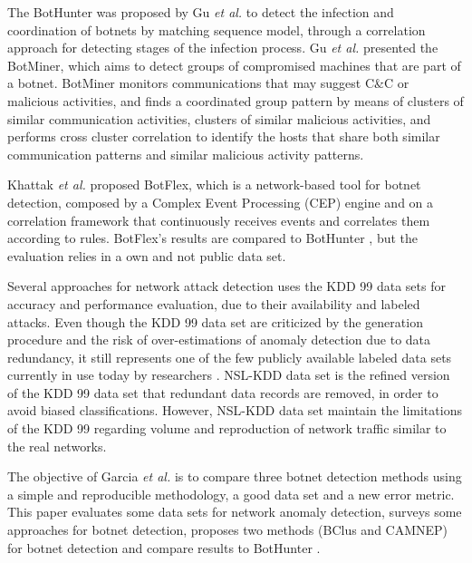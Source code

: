 The BotHunter was proposed by Gu \emph{et al.} \cite{gu2007bothunter} to detect the infection and coordination of botnets by matching sequence model, through a correlation approach for detecting stages of the infection process.  Gu \emph{et al.} \cite{gu2008botminer} presented the BotMiner, which aims to detect groups of compromised machines that are part of a botnet. BotMiner monitors communications that may suggest C\&C or malicious activities, and finds a coordinated group pattern by means of clusters of similar communication activities, clusters of similar malicious activities, and performs cross cluster correlation to identify the hosts that share both similar communication patterns and similar malicious activity patterns.

Khattak \emph{et al.} \cite{khattak2015botflex} proposed BotFlex, which is a network-based tool for botnet detection, composed by a Complex Event Processing (CEP) engine and on a correlation framework that continuously receives events and correlates them according to rules. BotFlex's results are compared to BotHunter \cite{gu2007bothunter}, but the evaluation relies in a own and not public data set.

Several approaches for network attack detection uses the KDD 99 \cite{ahmed2016survey,osanaiye2016distributed,bhuyan2014network} data sets for accuracy and performance evaluation, due to their availability and labeled attacks. Even though the KDD 99 data set are criticized by the generation procedure and the risk of over-estimations of anomaly detection due to data redundancy, it still represents one of the few publicly available labeled data sets currently in use today by researchers \cite{osanaiye2016distributed,bhuyan2014network}. NSL-KDD \cite{tavallaee2009detailed} data set is the refined version of the KDD 99 data set that redundant data records are removed, in order to avoid biased classifications. However, NSL-KDD data set maintain the limitations of the KDD 99 regarding volume and reproduction of network traffic similar to the real networks.

The objective of Garcia \emph{et al.} \cite{garcia2014empirical} is to compare three botnet detection methods using a simple and reproducible methodology, a good data set and a new error metric. This paper evaluates some data sets for network anomaly detection, surveys some approaches for botnet detection, proposes two methods (BClus and CAMNEP) for botnet detection and compare results to BotHunter \cite{gu2007bothunter}.

